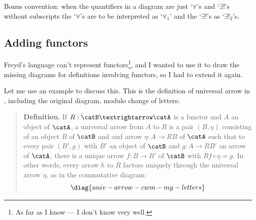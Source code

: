 \documentclass[oneside,12pt]{article}
\begin{document}
Bonus convention: when the quantifiers in a diagram are just `$∀$'s
and `$∃!$'s without subscripts the `$∀$'s are to be interpreted as
`$∀_1$' and the `$∃!$'s as `$∃!_2$'s.



%
\subsection{Adding functors \DONE}
\label{freyd-with-functors}

Freyd's language can't represent functors\footnote{As far as I know
  --- I don't know \cite{FreydScedrov} very well.}, and I wanted to
use it to draw the missing diagrams for definitions involving
functors, so I had to extend it again.

Let me use an example to discuss this. This is the definition of
universal arrow in \cite[p.55]{CWM2}, including the original diagram,
modulo change of letters:

%


\begin{quotation}

  {\bf Definition.} If $R: \catB→\catA$ is a functor and $A$ an object
  of $\catA$, a universal arrow from $A$ to $R$ is a pair $(B,η)$
  consisting of an object $B$ of $\catB$ and and arrow $η:A→RB$ of
  $\catA$ such that to every pair $(B',g)$ with $B'$ an object of
  $\catB$ and $g:A→RB'$ an arrow of $\catA$, there is a unique arrow
  $f:B→B'$ of $\catB$ with $Rf∘η=g$. In other words, every arrow $h$
  to $R$ factors uniquely through the universal arrow $η$, as in the
  commutative diagram:
  $$\pu
    \diag{univ-arrow-cwm-my-letters}
  $$

\end{quotation}
\end{document}
